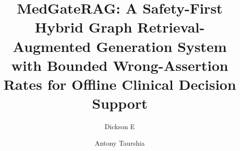\documentclass[preprint,12pt,a4paper]{elsarticle}
\begin{document}
\begin{frontmatter}

\title{MedGateRAG: A Safety-First Hybrid Graph Retrieval-Augmented Generation
       System with Bounded Wrong-Assertion Rates for Offline Clinical Decision
       Support}

\author[aff1]{Dickson E\texorpdfstring{}{}}
\author[aff1]{Antony Taurshia}

\address[aff1]{Department of Data Science and Cyber Security, Karunya Institute of Technology and Sciences, Coimbatore, India}


\end{frontmatter}
\end{document}
